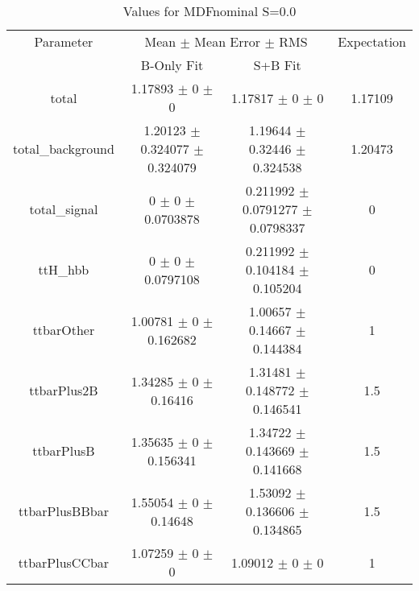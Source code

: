 \begin{table}
\centering
\caption{Values for MDFnominal S=0.0}
\begin{tabular}{cccc}
\toprule
Parameter & \multicolumn{2}{c}{Mean $\pm$ Mean Error $\pm$ RMS} & Expectation\\
 & B-Only Fit & S+B Fit & \\
\midrule
total & \num{1.17893} $\pm$ \num{0} $\pm$ \num{0} & \num{1.17817} $\pm$ \num{0} $\pm$ \num{0} & \num{1.17109}\\
total\_background & \num{1.20123} $\pm$ \num{0.324077} $\pm$ \num{0.324079} & \num{1.19644} $\pm$ \num{0.32446} $\pm$ \num{0.324538} & \num{1.20473}\\
total\_signal & \num{0} $\pm$ \num{0} $\pm$ \num{0.0703878} & \num{0.211992} $\pm$ \num{0.0791277} $\pm$ \num{0.0798337} & \num{0}\\
ttH\_hbb & \num{0} $\pm$ \num{0} $\pm$ \num{0.0797108} & \num{0.211992} $\pm$ \num{0.104184} $\pm$ \num{0.105204} & \num{0}\\
ttbarOther & \num{1.00781} $\pm$ \num{0} $\pm$ \num{0.162682} & \num{1.00657} $\pm$ \num{0.14667} $\pm$ \num{0.144384} & \num{1}\\
ttbarPlus2B & \num{1.34285} $\pm$ \num{0} $\pm$ \num{0.16416} & \num{1.31481} $\pm$ \num{0.148772} $\pm$ \num{0.146541} & \num{1.5}\\
ttbarPlusB & \num{1.35635} $\pm$ \num{0} $\pm$ \num{0.156341} & \num{1.34722} $\pm$ \num{0.143669} $\pm$ \num{0.141668} & \num{1.5}\\
ttbarPlusBBbar & \num{1.55054} $\pm$ \num{0} $\pm$ \num{0.14648} & \num{1.53092} $\pm$ \num{0.136606} $\pm$ \num{0.134865} & \num{1.5}\\
ttbarPlusCCbar & \num{1.07259} $\pm$ \num{0} $\pm$ \num{0} & \num{1.09012} $\pm$ \num{0} $\pm$ \num{0} & \num{1}\\
\bottomrule
\end{tabular}
\end{table}